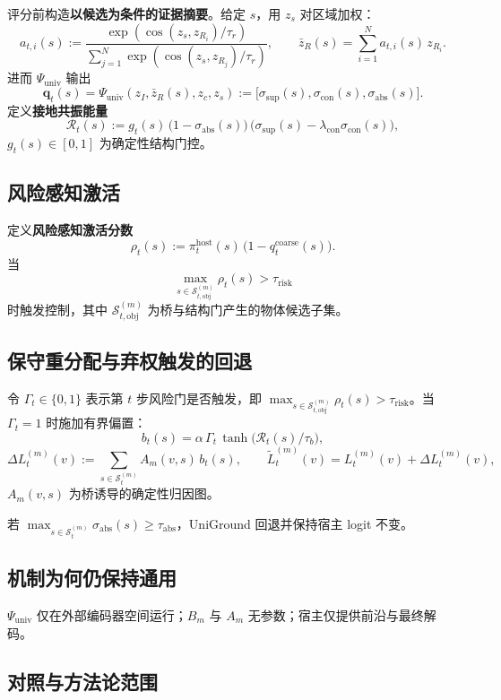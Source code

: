 评分前构造\textbf{以候选为条件的证据摘要}。给定 $s$，用 $z_s$ 对区域加权：
\[
a_{t,i}(s)
:=
\frac{\exp(\cos(z_s, z_{R_i}) / \tau_r)}
{\sum_{j=1}^{N} \exp(\cos(z_s, z_{R_j}) / \tau_r)},
\qquad
\bar z_R(s) = \sum_{i=1}^{N} a_{t,i}(s)\, z_{R_i}.
\]
进而 $\Psi_{\mathrm{univ}}$ 输出
\[
\mathbf{q}_t(s) = \Psi_{\mathrm{univ}}(z_I, \bar z_R(s), z_c, z_s)
:= \big[\sigma_{\mathrm{sup}}(s), \sigma_{\mathrm{con}}(s), \sigma_{\mathrm{abs}}(s)\big].
\]
定义\textbf{接地共振能量}
\[
\mathcal{R}_t(s)
:= g_t(s)\,\big(1-\sigma_{\mathrm{abs}}(s)\big)\,
\big(\sigma_{\mathrm{sup}}(s) - \lambda_{\mathrm{con}}\sigma_{\mathrm{con}}(s)\big),
\]
$g_t(s)\in[0,1]$ 为确定性结构门控。

\subsection{风险感知激活}

定义\textbf{风险感知激活分数}
\[
\rho_t(s)
:=
\pi_t^{\mathrm{host}}(s)\,\bigl(1-q_t^{\mathrm{coarse}}(s)\bigr).
\]
当
\[
\max_{s \in \mathcal{S}_{t,\mathrm{obj}}^{(m)}} \rho_t(s) > \tau_{\mathrm{risk}}
\]
时触发控制，其中 $\mathcal{S}_{t,\mathrm{obj}}^{(m)}$ 为桥与结构门产生的物体候选子集。

\subsection{保守重分配与弃权触发的回退}

令 $\Gamma_t \in \{0,1\}$ 表示第 $t$ 步风险门是否触发，即 $\max_{s \in \mathcal{S}_{t,\mathrm{obj}}^{(m)}} \rho_t(s) > \tau_{\mathrm{risk}}$。当 $\Gamma_t=1$ 时施加有界偏置：
\[
b_t(s) = \alpha \, \Gamma_t \, \tanh\!\big(\mathcal{R}_t(s) / \tau_b\big),
\]
\[
\Delta L_t^{(m)}(v)
:=
\sum_{s \in \mathcal{S}_t^{(m)}} A_m(v,s)\, b_t(s),
\qquad
\widetilde{L}_t^{(m)}(v) = L_t^{(m)}(v) + \Delta L_t^{(m)}(v),
\]
$A_m(v,s)$ 为桥诱导的确定性归因图。

若 $\max_{s \in \mathcal{S}_t^{(m)}} \sigma_{\mathrm{abs}}(s) \ge \tau_{\mathrm{abs}}$，UniGround 回退并保持宿主 logit 不变。

\subsection{机制为何仍保持通用}

$\Psi_{\mathrm{univ}}$ 仅在外部编码器空间运行；$B_m$ 与 $A_m$ 无参数；宿主仅提供前沿与最终解码。

\subsection{对照与方法论范围}

